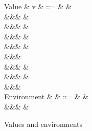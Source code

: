 \begin{figure}
\begin{syntaxfig}
\mbox{Value}
&
v
&
::=
&
\bot
&
\\
&&&
\exTrue \mid \exFalse
&
\\
&&&
&
\\
&&&
&
\\
&&&
&
\\
&&&
\\
&&&
\exNil
&
\\
&&&
&
\\
&&&
\\[2mm]
\mbox{Environment}
&
\rho
&
::=
&
\envEmpty
&
\\
&&&
&
\end{syntaxfig}
\caption{Values and environments}
\end{figure}
